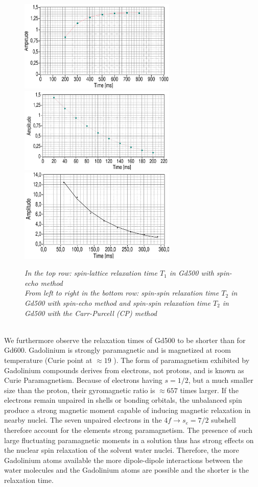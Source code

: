 \begin{figure}[h]
	\includegraphics[width=75mm]{GA500T1Fit}
	\includegraphics[width=75mm]{Gd500T2Fit}
	\includegraphics*[width=75mm]{Gd500T2CPFit}
	\centering
	\caption{\itshape In the top row: spin-lattice relaxation time $T_1$ in Gd500 with spin-echo method\\
		From left to right in the bottom row: spin-spin relaxation time $T_2$ in Gd500 with spin-echo method and spin-spin relaxation time $T_2$ in Gd500 with the Carr-Purcell (CP) method}
	\label{fig:4}
\end{figure}
\noindent
\\
We furthermore observe the relaxation times of Gd500 to be shorter than for Gd600. Gadolinium is strongly paramagnetic and is magnetized at room temperature (Curie point at $\approx 19$ \textcelsius). The form of paramagnetism exhibited by Gadolinium compounds derives from electrons, not protons, and is known as Curie Paramagnetism. Because of electrons having $s=1/2$, but a much smaller size than the proton, their gyromagnetic ratio is $\approx 657$ times larger. If the electrons remain unpaired in shells or bonding orbitals, the unbalanced spin produce a strong magnetic moment capable of inducing magnetic relaxation in nearby nuclei. The seven unpaired electrons in the $4f \rightarrow s_e = 7/2$ subshell therefore account for the elements strong paramagnetism. \cite{Gadolinium} The presence of such large fluctuating paramagnetic moments in a solution thus has strong effects on the nuclear spin relaxation of the solvent water nuclei. Therefore, the more Gadolinium atoms available the more dipole-dipole interactions between the water molecules and the Gadolinium atoms are possible and the shorter is the relaxation time.
